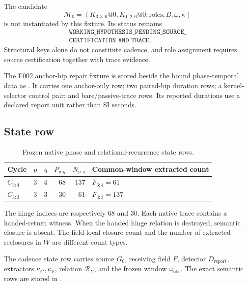 The candidate
\[
\mathcal M_0=(K_{3:3:6}@0,K_{1:2:6}@0;\mathrm{roles},B,\omega,\kappa)
\]
is not instantiated by this fixture. Its status remains
\[
\begin{gathered}
\texttt{WORKING\_HYPOTHESIS\_PENDING\_SOURCE\_}\\
\texttt{CERTIFICATION\_AND\_TRACE}.
\end{gathered}
\]
Structural keys alone do not constitute cadence, and role assignment requires
source certification together with trace evidence.

The F002 anchor-bip repair fixture is stored beside the bound
phase-temporal data as . It carries one
anchor-only row; two paired-bip duration rows; a kernel-selector control
pair; and bare/passive-trace rows. Its reported durations use a declared
report unit rather than SI seconds.

\subsection{State row}\label{manual:phase-temporal:state-row}
\begin{table}[H]
\centering
\small
\caption{Frozen native phase and relational-recurrence state rows.}
\begin{tabular}{lrrrrl}
\toprule
Cycle & \(p\) & \(q\) & \(P_{p:q}\) & \(N_{p:q}\) & Common-window extracted count\\
\midrule
\(C_{3:4}\) & 3 & 4 & 68 & 137 & \(F_{3:4}=61\)\\
\(C_{3:3}\) & 3 & 3 & 30 & 61 & \(F_{3:3}=137\)\\
\bottomrule
\end{tabular}
\label{tab:manual-phase-temporal-state}
\end{table}

The hinge indices are respectively 68 and 30. Each native trace contains a handed-return witness. When the handed hinge relation is destroyed, semantic closure is absent. The field-local closure count and the number of extracted reclosures in \(W\) are different count types.

The cadence state row carries source \(G_0\), receiving field \(F\), detector \(D_{\mathrm{report}}\), extractors \(\kappa_G,\kappa_F\), relation \(\mathcal R_{\Sigma}\), and the frozen window \(\omega_{\mathrm{obs}}\). The exact semantic rows are stored in .

